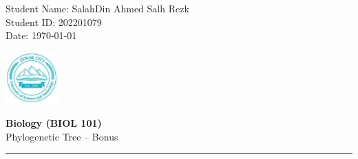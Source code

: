 \documentclass[11pt,letterpaper]{article}
\begin{document}
\pagestyle{plain}

\begin{flushleft}
Student Name: SalahDin Ahmed Salh Rezk\\
Student ID: 202201079 \\
Date: \today
\end{flushleft}

\begin{flushright}\vspace{-15mm}
\includegraphics[height=2cm]{zcust.jpg}
\end{flushright}

\begin{center}\vspace{-1cm}
\textbf{\large Biology (BIOL 101)}\\
Phylogenetic Tree -- Bonus
\end{center}


\rule{\linewidth}{0.1mm}

\bigskip
\bigskip

\end{document}
